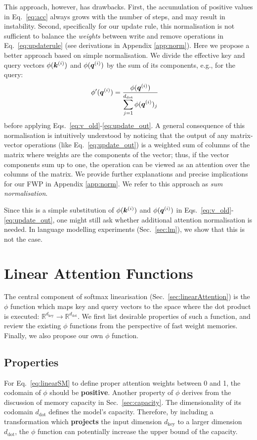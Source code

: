 \documentclass{article}
\theoremstyle{definition}
\begin{document}
This approach, however, has drawbacks.
First, the accumulation of positive values in Eq.~\ref{eq:acc} always grows with the number of steps,
and may result in instability.
Second, specifically for our update rule, 
this normalisation is not sufficient to balance the \textit{weights} between write
and remove operations in Eq.~\ref{eq:updaterule}
(see derivations in Appendix \ref{app:norm}).
Here we propose a better approach based on simple normalisation.
We divide the effective key and query vectors $\phi({\bm{k}}^{(i)})$ and $\phi({\bm{q}}^{(i)})$
by the sum of its components, e.g., for the query:
\begin{align}
\phi'({\bm{q}}^{(i)}) &= \displaystyle \dfrac{\phi({\bm{q}}^{(i)})}{ \displaystyle \sum_{j=1}^{d_\text{dot}} \phi({\bm{q}}^{(i)})_j}
\end{align}
before applying  Eqs.~\ref{eq:v_old}-\ref{eq:update_out}.
A general consequence of this normalisation is  intuitively understood 
by noticing that the output of any matrix-vector operations
(like Eq.~\ref{eq:update_out}) is a
weighted sum of columns of the matrix where weights are the components
of the vector; thus, if the vector components sum up to one,
the operation can be viewed as an attention over the columns of the matrix.
We provide further explanations and precise
implications for our FWP in Appendix \ref{app:norm}.
We refer to this approach as \textit{sum normalisation}.

Since this is a simple substitution of $\phi({\bm{k}}^{(i)})$ and $\phi({\bm{q}}^{(i)})$ in Eqs.~\ref{eq:v_old}-\ref{eq:update_out},
one might still ask whether additional attention normalisation is needed.
In language modelling experiments (Sec.~\ref{sec:lm}), we show that this is not the case.

\section{Linear Attention Functions}
\label{sec:phi_section}
The central component of softmax linearisation (Sec.~\ref{sec:linearAttention}) is the $\phi$ function
which maps key and query vectors to the space where the dot product is executed: 
$\mathbb{R}^{d_\text{key}} \rightarrow \mathbb{R}^{d_\text{dot}}$. 
We first list desirable properties of such a function,
and review the existing $\phi$ functions from the perspective of fast weight memories. 
Finally, we also propose our own $\phi$ function.
\subsection{Properties}
\label{sec:phi_prop}
For Eq.~\ref{eq:linearSM} to define proper attention weights
between 0 and 1, the codomain of $\phi$ should be \textbf{positive}.
Another property of $\phi$ derives from the discussion of memory
capacity in Sec.~\ref{sec:capacity}.
The dimensionality of its codomain $d_\text{dot}$ defines the model's capacity.
Therefore, by including a transformation which \textbf{projects} the input dimension $d_\text{key}$
to a larger dimension $d_\text{dot}$, the $\phi$ function can potentially increase the upper bound
of the capacity.
\end{document}
